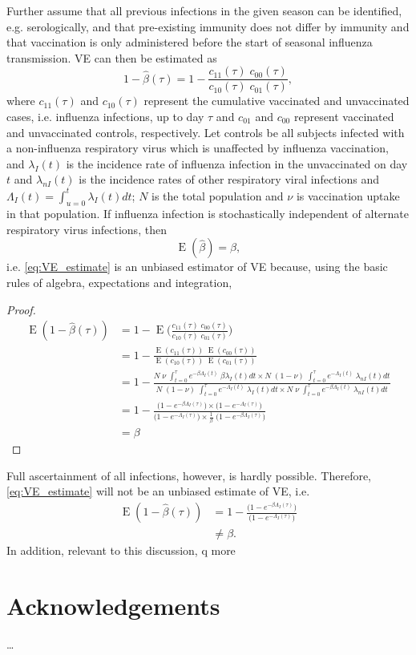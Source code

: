 \documentclass{article}[11pt]
\DeclareMathOperator{\E}{E}
\begin{document}
Further assume that all previous infections in the given season can be identified, e.g. serologically, and that pre-existing immunity does not differ by immunity and that vaccination is only administered before the start of seasonal influenza transmission. VE can then be estimated as
%
\begin{equation}
\label{eq:VE_estimate}
1- \hat{\beta}(\tau) = 1 - \frac{c_{11}(\tau) \; c_{00}(\tau)}{c_{10}(\tau)\; c_{01}(\tau)},
\end{equation}
%
where $c_{11}(\tau)$ and $c_{10}(\tau)$ represent the cumulative vaccinated and unvaccinated cases, i.e. influenza infections, up to day $\tau$ and $c_{01}$ and $c_{00}$ represent vaccinated and unvaccinated controls, respectively. Let controls be all subjects infected with a non-influenza respiratory virus which is unaffected by influenza vaccination, and $\lambda_I(t)$ is the incidence rate of influenza infection in the unvaccinated on day $t$ and $\lambda_{nI}(t)$ is the incidence rates of other respiratory viral infections and $\Lambda_I(t) = \int_{u=0}^{t} \lambda_I(t) dt$; $N$ is the total population and $\nu$ is vaccination uptake in that population.
If influenza infection is stochastically independent of alternate respiratory virus infections, then 
\begin{equation}
\label{eq:unbiased}
\E(\hat{\beta}) = \beta,
\end{equation}
%
i.e. \eqref{eq:VE_estimate} is an unbiased estimator of VE because, using the basic rules of algebra, expectations and integration,
%

\begin{proof}
	\begin{align}
\E(1- \hat{\beta}(\tau)) &= 1 - \E\big(\frac{c_{11}(\tau) \; c_{00}(\tau)}{c_{10}(\tau)\; c_{01}(\tau)}\big)\\
  &= 1 - \frac{\E(c_{11}(\tau)) \; \E(c_{00}(\tau))}{\E(c_{10}(\tau))\; \E(c_{01}(\tau))} \\
  &= 1 - \frac{N \; \nu \; \int_{t=0}^{\tau} e^{-\beta \Lambda_I(t)} \; \beta \lambda_I(t) dt \times 
  	N \; (1 - \nu) \; \int_{t=0}^{\tau} e^{-\Lambda_I(t)}\; \lambda_{nI}(t) dt}{
  		N \; (1 - \nu) \; \int_{t=0}^{\tau} e^{-\Lambda_I(t)}\; \lambda_I(t) dt \times
  		N \; \nu \; \int_{t=0}^{\tau} e^{-\beta \Lambda_I(t)}\;\lambda_{nI}(t) dt} \\
  	&= 1 - \frac{\big(1 - e^{ - \beta \Lambda_I(\tau)}\big)\times \big(1 - e^{ - \Lambda_I(\tau)}\big)}{\big(1 - e^{ - \Lambda_I(\tau)}\big)\times \frac{1}{\beta} \; \big(1 - e^{ - \beta \Lambda_I(\tau)}\big) }\\
  			&= \beta 
\end{align}
%
\end{proof}
%
Full ascertainment of all infections, however, is hardly possible. Therefore, \eqref{eq:VE_estimate} will not be an unbiased estimate of VE, i.e.
%
\begin{align}
\E (1 - \hat{\beta}(\tau)) & = 1 - \frac{\big(1 - e^{ - \beta \Lambda_I(\tau)}\big)}{\big(1 - e^{ - \Lambda_I(\tau)}\big)} \\
 &\neq \beta.
\end{align}
%
In addition, relevant to this discussion, q
 more
%
\section*{Acknowledgements}
\ldots
\clearpage
%
\printbibliography
%
%
%
\end{document}
